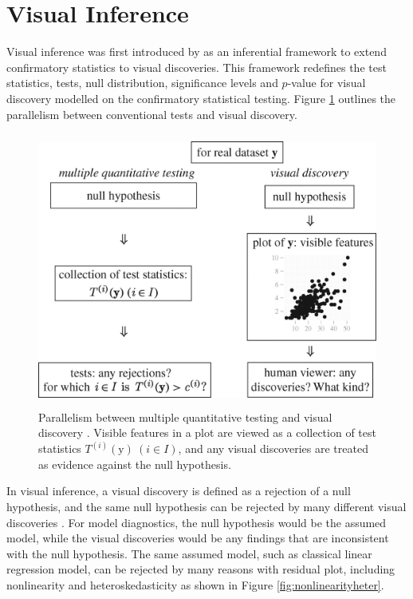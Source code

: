 \documentclass{monashthesis}
\theoremstyle{definition}
\theoremstyle{definition}
\theoremstyle{definition}
\theoremstyle{definition}
\theoremstyle{remark}
\begin{document}
\hypertarget{visual-inference}{%
\section{Visual Inference}\label{visual-inference}}

Visual inference was first introduced by \textcite{buja_statistical_2009} as an inferential framework to extend confirmatory statistics to visual discoveries. This framework redefines the test statistics, tests, null distribution, significance levels and \(p\)-value for visual discovery modelled on the confirmatory statistical testing. Figure \ref{fig:parallelism} outlines the parallelism between conventional tests and visual discovery.

\begin{figure}
\centering
\includegraphics[width=4.6875in,height=3.55208in]{figures/rsta2009012001.jpg}
\caption{Parallelism between multiple quantitative testing and visual discovery \autocite{buja_statistical_2009}. Visible features in a plot are viewed as a collection of test statistics \(T^{(i)}(\boldsymbol{\mathrm{y}})~(i \in I)\), and any visual discoveries are treated as evidence against the null hypothesis. \label{fig:parallelism}}
\end{figure}



In visual inference, a visual discovery is defined as a rejection of a null hypothesis, and the same null hypothesis can be rejected by many different visual discoveries \autocite{buja_statistical_2009}. For model diagnostics, the null hypothesis would be the assumed model, while the visual discoveries would be any findings that are inconsistent with the null hypothesis. The same assumed model, such as classical linear regression model, can be rejected by many reasons with residual plot, including nonlinearity and heteroskedasticity as shown in Figure \ref{fig:nonlinearityheter}.
\end{document}
